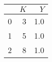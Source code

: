 \begin{tabular}{lrr}
\toprule
{} &  $K$ &  $Y$ \\
\midrule
0 &    3 &  1.0 \\
1 &    5 &  1.0 \\
2 &    8 &  1.0 \\
\bottomrule
\end{tabular}
